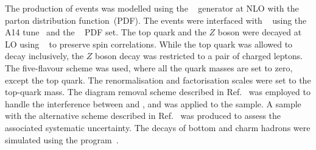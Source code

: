 The production of \tWZ events was modelled using the \MGNLO[2.3.3]~\cite{Alwall:2014hca}
generator at NLO with the \NNPDF[3.0nlo]~\cite{Ball:2014uwa} parton distribution function~(PDF).
The events were interfaced with
\PYTHIA[8.212]~\cite{Sjostrand:2014zea} using the A14 tune~\cite{ATL-PHYS-PUB-2014-021} and the \NNPDF[2.3lo]~\cite{Ball:2014uwa} PDF set.
The top quark and the $Z$ boson were decayed at LO using \MADSPIN~\cite{Frixione:2007zp,Artoisenet:2012st} to preserve spin correlations.
While the top quark was allowed to decay inclusively, the $Z$ boson decay was restricted to a pair of charged leptons.
The five-flavour scheme was used, where all the quark masses are set to zero, except the top quark. 
The renormalisation and factorisation scales were set to the top-quark mass.
The diagram removal scheme described in Ref.~\cite{Frixione:2008yi} was employed to handle the interference 
between \tWZ and \ttZ, and was applied to the \tWZ sample.
A sample with the alternative scheme described in Ref.~\cite{Demartin:2016axk} was produced to assess the associated systematic uncertainty.
The decays of bottom and charm hadrons were simulated using the \EVTGEN[1.2.0] program~\cite{Lange:2001uf}.

